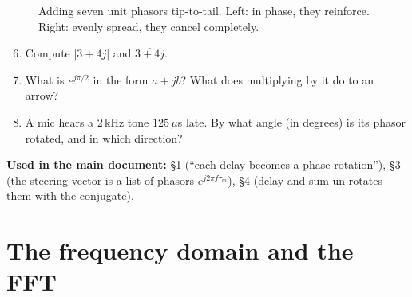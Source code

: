 \documentclass[11pt]{article}
\begin{document}
\begin{figure}[ht]
\centering
{}
\caption{Adding seven unit phasors tip-to-tail. Left: in phase, they reinforce. Right: evenly
spread, they cancel completely.}
\label{fig:phasorsum}
\end{figure}

\begin{checkyourself}
\begin{enumerate}[nosep]
\setcounter{enumi}{5}
\item Compute $|3+4j|$ and $\overline{3+4j}$.
\item What is $e^{j\pi/2}$ in the form $a+jb$? What does multiplying by it do to an arrow?
\item A mic hears a 2\,kHz tone $125\,\mu$s late. By what angle (in degrees) is its phasor rotated,
  and in which direction?
\end{enumerate}
\end{checkyourself}

\begin{whereused}
\textbf{Used in the main document:} \S1 (``each delay becomes a phase rotation''), \S3 (the
steering vector is a list of phasors $e^{j2\pi f\tau_m}$), \S4 (delay-and-sum un-rotates them
with the conjugate).
\end{whereused}

\section{The frequency domain and the FFT}\label{sec:fft}
\end{document}
